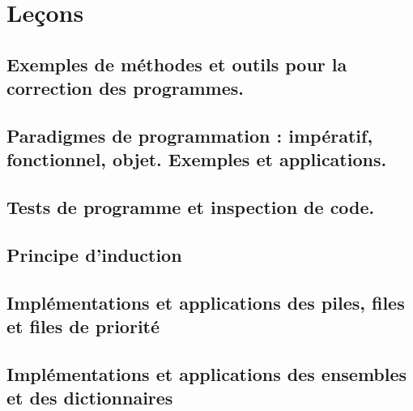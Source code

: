 




%

\tableofcontents

%

\part{Leçons}

\chapter{Exemples de méthodes et outils pour la correction des programmes.} \label{L1}


\chapter{Paradigmes de programmation : impératif, fonctionnel, objet. Exemples et applications.} \label{L2}


\chapter{Tests de programme et inspection de code.}
\label{L3}


\chapter{Principe d'induction}
\label{L4}


\chapter{Implémentations et applications des piles, files et files de priorité}
\label{L5}


\chapter{Implémentations et applications des ensembles et des dictionnaires}
\label{L6}


